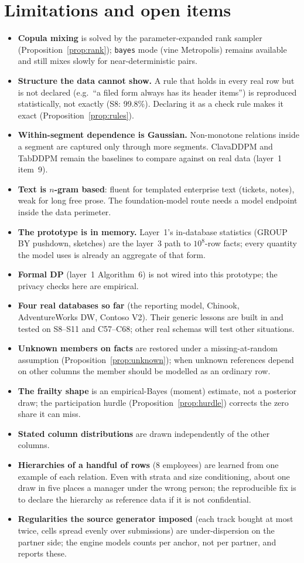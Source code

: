 \documentclass[11pt,a4paper]{article}
\theoremstyle{definition}
\theoremstyle{remark}
\begin{document}
\section{Limitations and open items}\label{sec:limits}
\begin{itemize}
\item \textbf{Copula mixing} is solved by the parameter-expanded rank sampler (Proposition~\ref{prop:rank}); \texttt{bayes} mode (vine Metropolis) remains available and still mixes slowly for near-deterministic pairs.
\item \textbf{Structure the data cannot show.} A rule that holds in every real row but is not declared (e.g.\ ``a filed form always has its header items'') is reproduced statistically, not exactly (S8: 99.8\%). Declaring it as a check rule makes it exact (Proposition~\ref{prop:rules}).
\item \textbf{Within-segment dependence is Gaussian.} Non-monotone relations inside a segment are captured only through more segments. ClavaDDPM and TabDDPM remain the baselines to compare against on real data (layer~1 item~9).
\item \textbf{Text is $n$-gram based}: fluent for templated enterprise text (tickets, notes), weak for long free prose. The foundation-model route needs a model endpoint inside the data perimeter.
\item \textbf{The prototype is in memory.} Layer~1's in-database statistics (GROUP BY pushdown, sketches) are the layer~3 path to $10^8$-row facts; every quantity the model uses is already an aggregate of that form.
\item \textbf{Formal DP} (layer~1 Algorithm~6) is not wired into this prototype; the privacy checks here are empirical.
\item \textbf{Four real databases so far} (the reporting model, Chinook, AdventureWorks DW, Contoso V2). Their generic lessons are built in and tested on S8--S11 and C57--C68; other real schemas will test other situations.
\item \textbf{Unknown members on facts} are restored under a missing-at-random assumption (Proposition~\ref{prop:unknown}); when unknown references depend on other columns the member should be modelled as an ordinary row.
\item \textbf{The frailty shape} is an empirical-Bayes (moment) estimate, not a posterior draw; the participation hurdle (Proposition~\ref{prop:hurdle}) corrects the zero share it can miss.
\item \textbf{Stated column distributions} are drawn independently of the other columns.
\item \textbf{Hierarchies of a handful of rows} (8 employees) are learned from one example of each relation. Even with strata and size conditioning, about one draw in five places a manager under the wrong person; the reproducible fix is to declare the hierarchy as reference data if it is not confidential.
\item \textbf{Regularities the source generator imposed} (each track bought at most twice, cells spread evenly over submissions) are under-dispersion on the partner side; the engine models counts per anchor, not per partner, and reports these.
\end{itemize}
\end{document}
